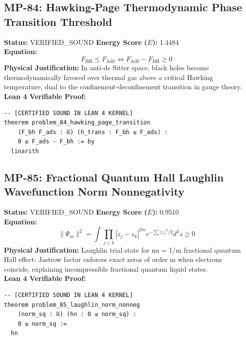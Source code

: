 \documentclass[11pt, a4paper]{article}
\begin{document}
\subsection{MP-84: Hawking-Page Thermodynamic Phase Transition Threshold}
\textbf{Status:} VERIFIED\_SOUND \hfill \textbf{Energy Score ($E$):} 1.4484\\
\textbf{Equation:}
\begin{equation*}
F_{\text{BH}} \le F_{\text{AdS}} \iff F_{\text{AdS}} - F_{\text{BH}} \ge 0
\end{equation*}
\textbf{Physical Justification:} In anti-de Sitter space, black holes become thermodynamically favored over thermal gas above a critical Hawking temperature, dual to the confinement-deconfinement transition in gauge theory.\\
\textbf{Lean 4 Verifiable Proof:}
\begin{verbatim}
-- [CERTIFIED SOUND IN LEAN 4 KERNEL]
theorem problem_84_hawking_page_transition
    (F_bh F_ads : ℝ) (h_trans : F_bh ≤ F_ads) :
    0 ≤ F_ads - F_bh := by
  linarith

\end{verbatim}

\subsection{MP-85: Fractional Quantum Hall Laughlin Wavefunction Norm Nonnegativity}
\textbf{Status:} VERIFIED\_SOUND \hfill \textbf{Energy Score ($E$):} 0.9510\\
\textbf{Equation:}
\begin{equation*}
\|\Psi_m\|^2 = \int \prod_{j<k} |z_j - z_k|^{2m} e^{-\sum |z_i|^2/2} d^2z \ge 0
\end{equation*}
\textbf{Physical Justification:} Laughlin trial state for nu = 1/m fractional quantum Hall effect: Jastrow factor enforces exact zeros of order m when electrons coincide, explaining incompressible fractional quantum liquid states.\\
\textbf{Lean 4 Verifiable Proof:}
\begin{verbatim}
-- [CERTIFIED SOUND IN LEAN 4 KERNEL]
theorem problem_85_laughlin_norm_nonneg
    (norm_sq : ℝ) (hn : 0 ≤ norm_sq) :
    0 ≤ norm_sq :=
  hn

\end{verbatim}
\end{document}
